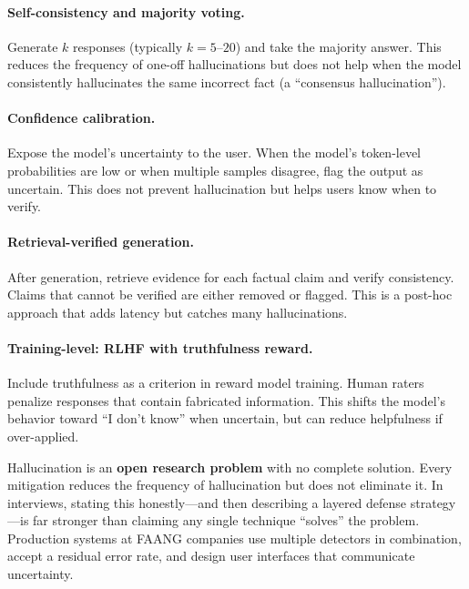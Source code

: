 \paragraph{Self-consistency and majority voting.}
Generate $k$ responses (typically $k = 5$--$20$) and take the majority answer.
This reduces the frequency of one-off hallucinations but does not help when
the model consistently hallucinates the same incorrect fact (a ``consensus
hallucination'').

\paragraph{Confidence calibration.}
Expose the model's uncertainty to the user.  When the model's token-level
probabilities are low or when multiple samples disagree, flag the output as
uncertain.  This does not prevent hallucination but helps users know when to
verify.

\paragraph{Retrieval-verified generation.}
After generation, retrieve evidence for each factual claim and verify
consistency.  Claims that cannot be verified are either removed or flagged.
This is a post-hoc approach that adds latency but catches many hallucinations.

\paragraph{Training-level: RLHF with truthfulness reward.}
Include truthfulness as a criterion in reward model training.  Human raters
penalize responses that contain fabricated information.  This shifts the model's
behavior toward ``I don't know'' when uncertain, but can reduce helpfulness if
over-applied.

\begin{warningbox}
Hallucination is an \textbf{open research problem} with no complete solution.
Every mitigation reduces the frequency of hallucination but does not eliminate
it.  In interviews, stating this honestly---and then describing a layered
defense strategy---is far stronger than claiming any single technique ``solves''
the problem.  Production systems at FAANG companies use multiple detectors in
combination, accept a residual error rate, and design user interfaces that
communicate uncertainty.
\end{warningbox}

